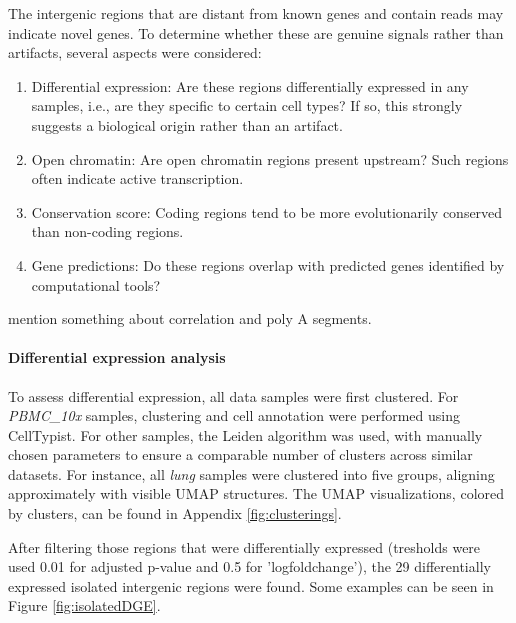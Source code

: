 The intergenic regions that are distant from known genes and contain reads may indicate novel genes.
To determine whether these are genuine signals rather than artifacts, several aspects were considered:
\begin{enumerate}
  \item Differential expression: Are these regions differentially expressed in any samples, i.e., are they specific to certain cell types?
  If so, this strongly suggests a biological origin rather than an artifact.
  \item Open chromatin: Are open chromatin regions present upstream? Such regions often indicate active transcription.
  \item Conservation score: Coding regions tend to be more evolutionarily conserved than non-coding regions.
  \item Gene predictions: Do these regions overlap with predicted genes identified by computational tools?
\end{enumerate}

mention something about correlation and poly A segments.

\paragraph{Differential expression analysis}

To assess differential expression, all data samples were first clustered.
For \textit{PBMC\_10x} samples, clustering and cell annotation were performed using CellTypist.
For other samples, the Leiden algorithm was used, with manually chosen parameters to ensure a comparable number of clusters across similar datasets.
For instance, all \textit{lung} samples were clustered into five groups, aligning approximately with visible UMAP structures.
The UMAP visualizations, colored by clusters, can be found in Appendix \ref{fig:clusterings}.

After filtering those regions that were differentially expressed (tresholds were used 0.01 for adjusted p-value and 0.5 for 'logfoldchange'),
the 29 differentially expressed isolated intergenic regions were found.
Some examples can be seen in Figure \ref{fig:isolatedDGE}.

